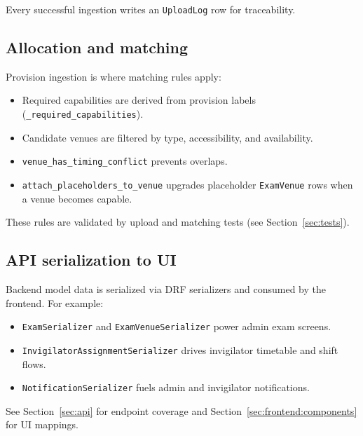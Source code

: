 Every successful ingestion writes an \texttt{UploadLog} row for traceability.

\subsection{Allocation and matching}
\label{subsec:dataflow:matching}

Provision ingestion is where matching rules apply:

\begin{itemize}
  \item Required capabilities are derived from provision labels (\texttt{\_required\_capabilities}).
  \item Candidate venues are filtered by type, accessibility, and availability.
  \item \texttt{venue\_has\_timing\_conflict} prevents overlaps.
  \item \texttt{attach\_placeholders\_to\_venue} upgrades placeholder \texttt{ExamVenue} rows when a venue becomes capable.
\end{itemize}

These rules are validated by upload and matching tests (see Section~\ref{sec:tests}).

\subsection{API serialization to UI}
\label{subsec:dataflow:api}

Backend model data is serialized via DRF serializers and consumed by the frontend. For example:

\begin{itemize}
  \item \texttt{ExamSerializer} and \texttt{ExamVenueSerializer} power admin exam screens.
  \item \texttt{InvigilatorAssignmentSerializer} drives invigilator timetable and shift flows.
  \item \texttt{NotificationSerializer} fuels admin and invigilator notifications.
\end{itemize}

See Section~\ref{sec:api} for endpoint coverage and Section~\ref{sec:frontend:components} for UI mappings.
